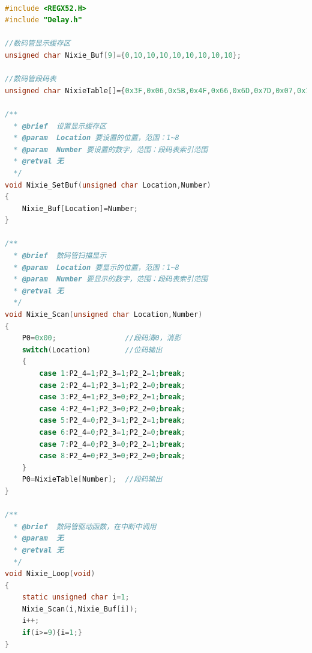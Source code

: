 \documentclass[12pt,hyperref,a4paper,UTF8]{ctexart}
\begin{document}
\begin{lstlisting}[language=C, caption={Nixie.c 数码管显示实现代码}]

#include <REGX52.H>
#include "Delay.h"

//数码管显示缓存区
unsigned char Nixie_Buf[9]={0,10,10,10,10,10,10,10,10};

//数码管段码表
unsigned char NixieTable[]={0x3F,0x06,0x5B,0x4F,0x66,0x6D,0x7D,0x07,0x7F,0x6F,0x00,0x40};

/**
  * @brief  设置显示缓存区
  * @param  Location 要设置的位置，范围：1~8
  * @param  Number 要设置的数字，范围：段码表索引范围
  * @retval 无
  */
void Nixie_SetBuf(unsigned char Location,Number)
{
	Nixie_Buf[Location]=Number;
}

/**
  * @brief  数码管扫描显示
  * @param  Location 要显示的位置，范围：1~8
  * @param  Number 要显示的数字，范围：段码表索引范围
  * @retval 无
  */
void Nixie_Scan(unsigned char Location,Number)
{
	P0=0x00;				//段码清0，消影
	switch(Location)		//位码输出
	{
		case 1:P2_4=1;P2_3=1;P2_2=1;break;
		case 2:P2_4=1;P2_3=1;P2_2=0;break;
		case 3:P2_4=1;P2_3=0;P2_2=1;break;
		case 4:P2_4=1;P2_3=0;P2_2=0;break;
		case 5:P2_4=0;P2_3=1;P2_2=1;break;
		case 6:P2_4=0;P2_3=1;P2_2=0;break;
		case 7:P2_4=0;P2_3=0;P2_2=1;break;
		case 8:P2_4=0;P2_3=0;P2_2=0;break;
	}
	P0=NixieTable[Number];	//段码输出
}

/**
  * @brief  数码管驱动函数，在中断中调用
  * @param  无
  * @retval 无
  */
void Nixie_Loop(void)
{
	static unsigned char i=1;
	Nixie_Scan(i,Nixie_Buf[i]);
	i++;
	if(i>=9){i=1;}
}


\end{lstlisting}
\end{document}
